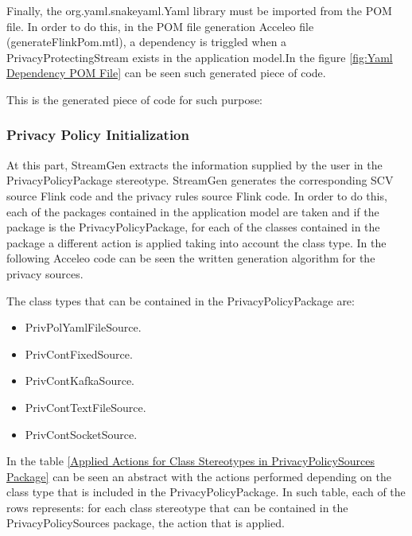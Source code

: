 Finally, the org.yaml.snakeyaml.Yaml library must be imported from the POM file. In order to do this, in the POM file generation Acceleo file (generateFlinkPom.mtl), a dependency is triggled when a PrivacyProtectingStream exists in the application model.In the figure \ref{fig:Yaml Dependency POM File} can be seen such generated piece of code.

This is the generated piece of code for such purpose:



\subsubsection{Privacy Policy Initialization}

At this part, StreamGen extracts the information supplied by the user in the PrivacyPolicyPackage stereotype. StreamGen generates the corresponding SCV source Flink code and the privacy rules source Flink code. In order to do this, each of the packages contained in the application model are taken and if the package is the PrivacyPolicyPackage, for each of the classes contained in the package a different action is applied taking into account the class type. In the following Acceleo code can be seen the written generation algorithm for the privacy sources.



The class types that can be contained in the PrivacyPolicyPackage are:

\begin{itemize}
\item PrivPolYamlFileSource.
\item PrivContFixedSource.
\item PrivContKafkaSource.
\item PrivContTextFileSource.
\item PrivContSocketSource.
\end{itemize}

In the table \ref{Applied Actions for Class Stereotypes in PrivacyPolicySources Package} can be seen an abstract with the actions performed depending on the class type that is included in the PrivacyPolicyPackage. In such table, each of the rows represents: for each class stereotype that can be contained in the PrivacyPolicySources package, the action that is applied.

